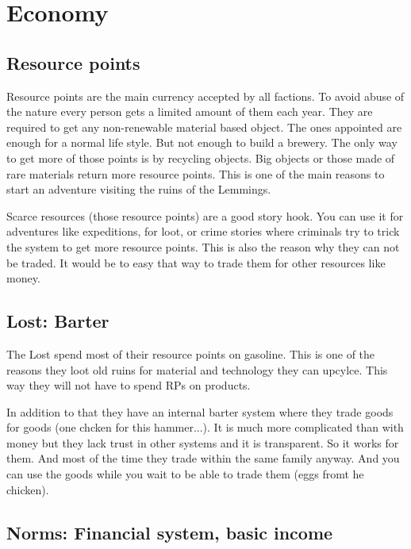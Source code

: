\chapter{Economy}

\section{Resource points}
\label{sec:Resource points}
Resource points are the main currency accepted by all factions. To avoid abuse of the nature every person gets a limited amount of them each year. They are required to get any non-renewable material based object. The ones appointed are enough for a normal life style. But not enough to build a brewery. The only way to get more of those points is by recycling objects. Big objects or those made of rare materials return more resource points. This is one of the main reasons to start an adventure visiting the ruins of the Lemmings. 

\begin{reason}[]
    Scarce resources (those resource points) are a good story hook. You can use it for adventures like expeditions, for loot, or crime stories where criminals try to trick the system to get more resource points. This is also the reason why they can not be traded. It would be to easy that way to trade them for other resources like money.
\end{reason}

\section{Lost: Barter}

The Lost spend most of their resource points on gasoline. This is one of the reasons they loot old ruins for material and technology they can upcylce. This way they will not have to spend RPs on products.

In addition to that they have an internal barter system where they trade goods for goods (one chcken for this hammer...).
It is much more complicated than with money but they lack trust in other systems and it is transparent. So it works for them. And most of the time they trade within the same family anyway.
And you can use the goods while you wait to be able to trade them (eggs fromt he chicken).


\section{Norms: Financial system, basic income}
\label{sec:basic income}

